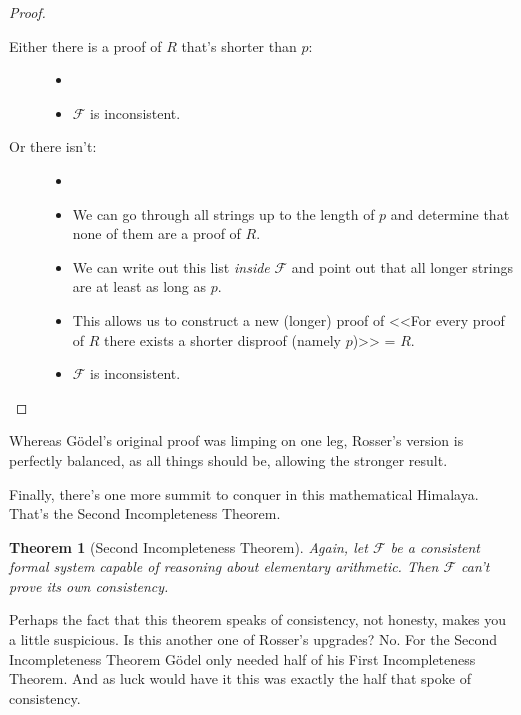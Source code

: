 \documentclass{article}
\newtheorem{theorem}{Theorem}
\newcommand{\F}{\ensuremath{\mathcal{F}}}
\begin{document}
\begin{proof}
\begin{description}
\begin{description}
\item[Either there is a proof of $R$ that's shorter than $p$:]
\begin{itemize}
\item[]
\item $\F$ is inconsistent. \lightning
\end{itemize}
\item[Or there isn't:]
\begin{itemize}
\item[]
\item We can go through all strings up to the length of $p$ and determine that none of them are a proof of $R$.
\item We can write out this list \textit{inside} $\F$ and point out that all longer strings are at least as long as $p$.
\item This allows us to construct a new (longer) proof of <<For every proof of $R$ there exists a shorter disproof (namely $p$)>> = $R$.
\item $\F$ is inconsistent. \lightning
\end{itemize}
\end{description}
\end{description}
\end{proof}

Whereas Gödel's original proof was limping on one leg, Rosser's version is perfectly balanced, as all things should be, allowing the stronger result.

Finally, there's one more summit to conquer in this mathematical Himalaya. That's the Second Incompleteness Theorem.

\begin{theorem}[Second Incompleteness Theorem]
Again, let $\F$ be a consistent formal system capable of reasoning about elementary arithmetic. Then $\F$ can't prove its own consistency.
\end{theorem}

Perhaps the fact that this theorem speaks of consistency, not honesty, makes you a little suspicious. Is this another one of Rosser's upgrades? No. For the Second Incompleteness Theorem Gödel only needed half of his First Incompleteness Theorem. And as luck would have it this was exactly the half that spoke of consistency.
\end{document}
